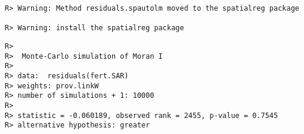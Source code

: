 \documentclass[
]{article}
\begin{document}
\begin{verbatim}
R> Warning: Method residuals.spautolm moved to the spatialreg package

R> Warning: install the spatialreg package
\end{verbatim}

\begin{verbatim}
R> 
R>  Monte-Carlo simulation of Moran I
R> 
R> data:  residuals(fert.SAR) 
R> weights: prov.linkW  
R> number of simulations + 1: 10000 
R> 
R> statistic = -0.060189, observed rank = 2455, p-value = 0.7545
R> alternative hypothesis: greater
\end{verbatim}
\end{document}
